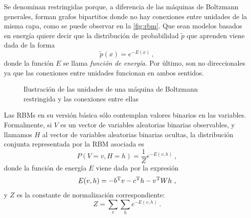 Se denominan restringidas porque, a diferencia de las máquinas de Boltzmann generales, forman grafos bipartitos donde no hay conexiones entre unidades de la misma capa, como se puede observar en la \autoref{fig:rbm}. Que sean modelos basados en energía quiere decir que la distribución de probabilidad $\tilde p$ que aprenden viene dada de la forma
\[
  \tilde p(x)=e^{-E(x)}~,
\]
donde la función $E$ se llama \textit{función de energía}. Por último, son no direccionales ya que las conexiones entre unidades funcionan en ambos sentidos.

\begin{figure}[hbtp]
  \centering
  
  \caption[Máquina de Boltzmann restringida]{Ilustración de las unidades de una máquina de Boltzmann restringida y las conexiones entre ellas}
  \label{fig:rbm}
\end{figure}

Las RBMs en su versión básica sólo contemplan valores binarios en las variables. Formalmente, si $V$ es un vector de variables aleatorias binarias observables, y llamamos $H$ al vector de variables aleatorias binarias ocultas, la distribución conjunta representada por la RBM asociada es
\[
  P(V=v,H=h)=\frac 1 Z e^{-E(v,h)}~,
\]
donde la función de energía $E$ viene dada por la expresión
\[
  E(v,h)=-b^{\mathrm{T}} v -c^{\mathrm{T}} h - v^{\mathrm{T}} W h~,
\]
y $Z$ es la constante de normalización correspondiente:
\[
Z=\sum_{v}\sum_{h}e^{-E(v,h)}~.
\]

